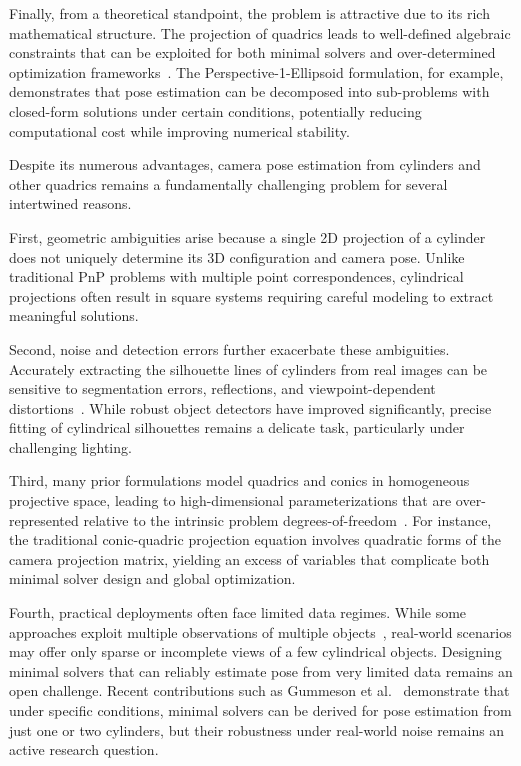 Finally, from a theoretical standpoint, the problem is attractive due to its rich mathematical structure. The projection of quadrics leads to well-defined algebraic constraints that can be exploited for both minimal solvers and over-determined optimization frameworks~\cite{Crocco2016,Gaudilliere2023}. The Perspective-1-Ellipsoid formulation, for example, demonstrates that pose estimation can be decomposed into sub-problems with closed-form solutions under certain conditions, potentially reducing computational cost while improving numerical stability.



Despite its numerous advantages, camera pose estimation from cylinders and other quadrics remains a fundamentally challenging problem for several intertwined reasons.

First, geometric ambiguities arise because a single 2D projection of a cylinder does not uniquely determine its 3D configuration and camera pose. Unlike traditional PnP problems with multiple point correspondences, cylindrical projections often result in square systems requiring careful modeling to extract meaningful solutions.

Second, noise and detection errors further exacerbate these ambiguities. Accurately extracting the silhouette lines of cylinders from real images can be sensitive to segmentation errors, reflections, and viewpoint-dependent distortions~\cite{gummeson22pose}. While robust object detectors have improved significantly, precise fitting of cylindrical silhouettes remains a delicate task, particularly under challenging lighting.

Third, many prior formulations model quadrics and conics in homogeneous projective space, leading to high-dimensional parameterizations that are over-represented relative to the intrinsic problem degrees-of-freedom~\cite{Gaudilliere2023,Rubino2018}. For instance, the traditional conic-quadric projection equation involves quadratic forms of the camera projection matrix, yielding an excess of variables that complicate both minimal solver design and global optimization.

Fourth, practical deployments often face limited data regimes. While some approaches exploit multiple observations of multiple objects~\cite{Rubino2018,Nicholson2019}, real-world scenarios may offer only sparse or incomplete views of a few cylindrical objects. Designing minimal solvers that can reliably estimate pose from very limited data remains an open challenge. Recent contributions such as Gummeson et al.~\cite{gummeson22pose} demonstrate that under specific conditions, minimal solvers can be derived for pose estimation from just one or two cylinders, but their robustness under real-world noise remains an active research question.

